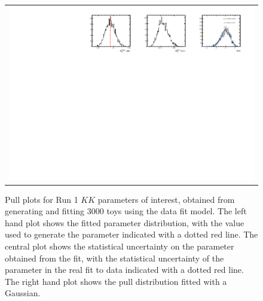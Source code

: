 \begin{figure}
\begin{tabular}{c}
\includegraphics[width=\textwidth]{ANA_resources/Plots/Data_fit/FitterBias//R_ds_KK_run1.pdf} \\
  \end{tabular}
  \caption{Pull plots for Run 1 $KK$ parameters of interest, obtained from generating and fitting 3000 toys using the data fit model. The left hand plot shows the fitted parameter distribution, with the value used to generate the parameter indicated with a dotted red line. The central plot shows the statistical uncertainty on the parameter obtained from the fit, with the statistical uncertainty of the parameter in the real fit to data indicated with a dotted red line. The right hand plot shows the pull distribution fitted with a Gaussian.}
\label{fig:KK_run1_pulls}
\end{figure}
